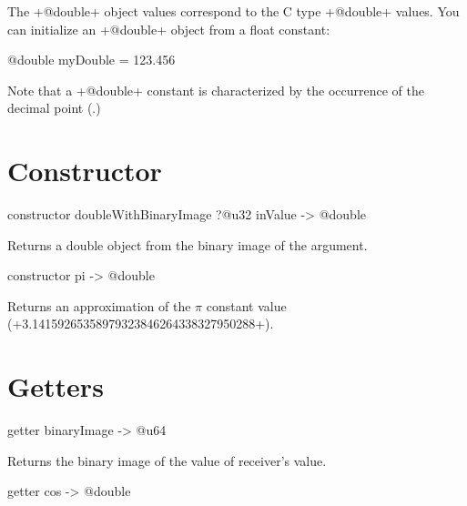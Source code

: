 



The \ggsq+@double+ object values correspond to the C type \ggsq+@double+ values. You can initialize an \ggsq+@double+ object from a float constant:

\begin{galgas4}
@double myDouble = 123.456
\end{galgas4}

Note that a \ggsq+@double+ constant is characterized by the occurrence of the decimal point (.)

\section{Constructor}


\begin{galgas4}
constructor doubleWithBinaryImage ?@u32 inValue -> @double
\end{galgas4}


Returns a double object from the binary image of the argument.




\begin{galgas4}
constructor pi -> @double
\end{galgas4}



Returns an approximation of the $\pi$ constant value (\ggsq+3.14159265358979323846264338327950288+).

\section{Getters}


\begin{galgas4}
getter binaryImage -> @u64
\end{galgas4}

Returns the binary image of the value of receiver's value.





\begin{galgas4}
getter cos -> @double
\end{galgas4}

